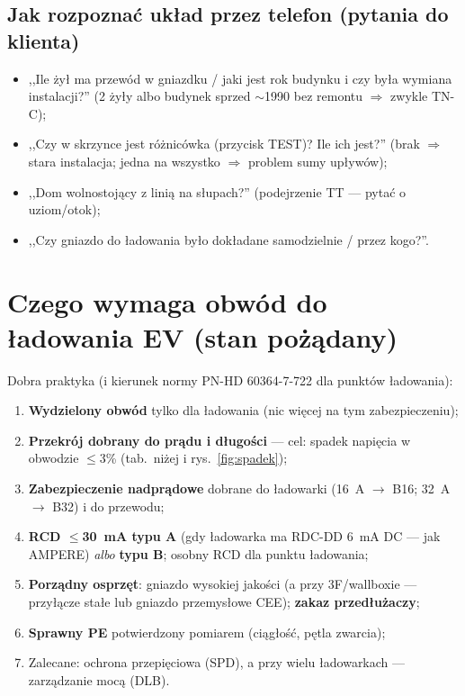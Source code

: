 \documentclass[11pt,a4paper]{article}
\begin{document}
\subsection{Jak rozpoznać układ przez telefon (pytania do klienta)}
\begin{itemize}
\item ,,Ile żył ma przewód w gniazdku / jaki jest rok budynku i czy była wymiana instalacji?''
(2 żyły albo budynek sprzed $\sim$1990 bez remontu $\Rightarrow$ zwykle TN-C);
\item ,,Czy w skrzynce jest różnicówka (przycisk TEST)? Ile ich jest?'' (brak $\Rightarrow$ stara
instalacja; jedna na wszystko $\Rightarrow$ problem sumy upływów);
\item ,,Dom wolnostojący z linią na słupach?'' (podejrzenie TT --- pytać o uziom/otok);
\item ,,Czy gniazdo do ładowania było dokładane samodzielnie / przez kogo?''.
\end{itemize}

\section{Czego wymaga obwód do ładowania EV (stan pożądany)}
\label{sec:wymagania}
Dobra praktyka (i kierunek normy PN-HD 60364-7-722 dla punktów ładowania):
\begin{enumerate}
\item \textbf{Wydzielony obwód} tylko dla ładowania (nic więcej na tym zabezpieczeniu);
\item \textbf{Przekrój dobrany do prądu i długości} --- cel: spadek napięcia w obwodzie
$\le$3\% (tab.~niżej i rys.~\ref{fig:spadek});
\item \textbf{Zabezpieczenie nadprądowe} dobrane do ładowarki (16~A $\to$ B16; 32~A $\to$ B32)
i do przewodu;
\item \textbf{RCD $\le$30~mA typu A} (gdy ładowarka ma RDC-DD 6~mA DC --- jak AMPERE) \emph{albo}
\textbf{typu B}; osobny RCD dla punktu ładowania;
\item \textbf{Porządny osprzęt}: gniazdo wysokiej jakości (a przy 3F/wallboxie --- przyłącze stałe
lub gniazdo przemysłowe CEE); \textbf{zakaz przedłużaczy};
\item \textbf{Sprawny PE} potwierdzony pomiarem (ciągłość, pętla zwarcia);
\item Zalecane: ochrona przepięciowa (SPD), a przy wielu ładowarkach --- zarządzanie mocą (DLB).
\end{enumerate}
\end{document}
